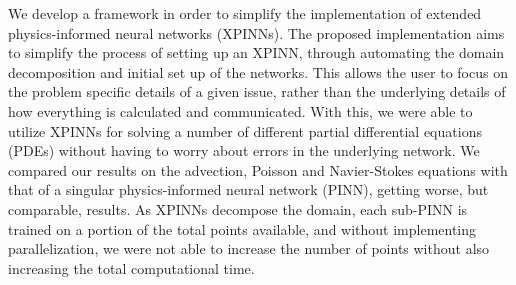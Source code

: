 We develop a framework in order to simplify the implementation of extended physics-informed neural networks (XPINNs).
The proposed implementation aims to simplify the process of setting up an XPINN, through automating the domain decomposition and initial set up of the networks.
This allows the user to focus on the problem specific details of a given issue, rather than the underlying details of how everything is calculated and communicated.
With this, we were able to utilize XPINNs for solving a number of different partial differential equations (PDEs) without having to worry about errors in the underlying network.
We compared our results on the advection, Poisson and Navier-Stokes equations with that of a singular physics-informed neural network (PINN), getting worse, but comparable, results.
As XPINNs decompose the domain, each sub-PINN is trained on a portion of the total points available, and without implementing parallelization, we were not able to increase the number of points without also increasing the total computational time.